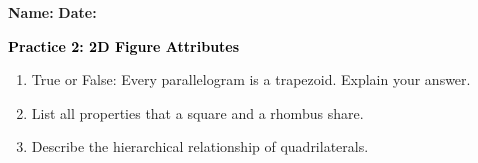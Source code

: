 \documentclass[12pt, letterpaper, fleqn]{article}
\begin{document}
\textbf{Name:} \underline{\hspace{5cm}}
\hfill
\textbf{Date:} \underline{\hspace{3cm}}\\

\begin{tcolorbox}[colback=customteal!20]
    \large\textcolor{black}{\textbf{Practice 2: 2D Figure Attributes}}
\end{tcolorbox}
\begin{enumerate}[itemsep=3.5cm, leftmargin=0.6cm]
\item True or False: Every parallelogram is a trapezoid. Explain your answer.
\vspace{3.5cm}
\item List all properties that a square and a rhombus share.
\vspace{3.5cm}
\item Describe the hierarchical relationship of quadrilaterals.
\end{enumerate}
\end{document}
